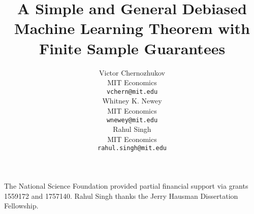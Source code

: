 \documentclass{article}
\title{A Simple and General Debiased Machine Learning Theorem with Finite Sample Guarantees}
\author{%
  Victor Chernozhukov \\
  MIT Economics \\
  \texttt{vchern@mit.edu} \\
   \And
   Whitney K. Newey \\
MIT Economics \\
   \texttt{wnewey@mit.edu} \\
   \And
   Rahul Singh \\
   MIT Economics \\
   \texttt{rahul.singh@mit.edu} \\
}
\begin{document}
\maketitle












%


\begin{ack}
The National Science Foundation provided partial financial support via
grants 1559172 and 1757140. Rahul Singh thanks the Jerry Hausman Dissertation Fellowship.
\end{ack}






% 
\newpage


\appendix






\end{document}
